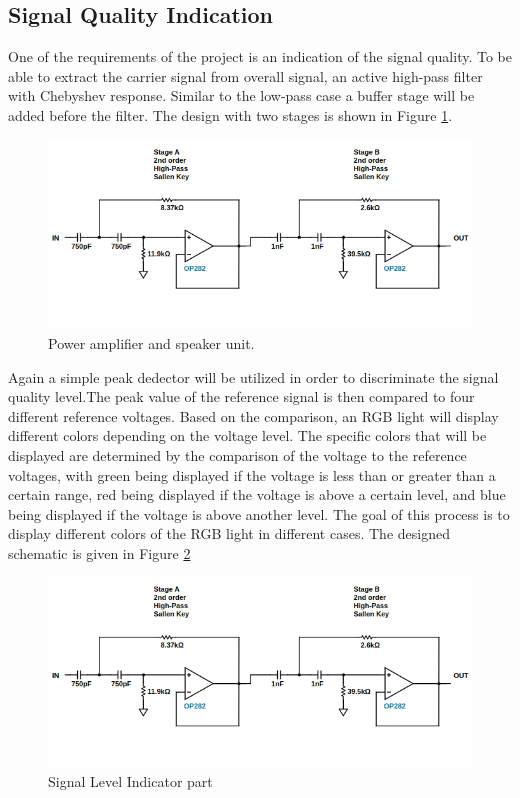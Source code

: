 \documentclass[a4paper,10pt]{IEEEtran}
\begin{document}
\subsection{Signal Quality Indication}
One of the requirements of the project is an indication of the signal quality. To be able to extract the carrier signal from overall signal, an active high-pass filter with Chebyshev response. Similar to the low-pass case a buffer stage will be added before the filter. The design with two stages is shown in Figure \ref*{active_high}.
\begin{figure}[H]
    \centering
    \includegraphics[width = 0.75\linewidth]{active_high_pass_circuit.png}
    \caption{Power amplifier and speaker unit.}
    \label{active_high}    
\end{figure} 

Again a simple peak dedector will be utilized in order to discriminate the signal quality level.The peak value of the reference signal is then compared to four different reference voltages. Based on the comparison, an RGB light will display different colors depending on the voltage level. The specific colors that will be displayed are determined by the comparison of the voltage to the reference voltages, with green being displayed if the voltage is less than or greater than a certain range, red being displayed if the voltage is above a certain level, and blue being displayed if the voltage is above another level. The goal of this process is to display different colors of the RGB light in different cases. The designed schematic is given in Figure \ref*{indicator}
\begin{figure}[H]
    \centering
    \includegraphics[width = 0.75\linewidth]{active_high_pass_circuit.png}
    \caption{Signal Level Indicator part}
    \label{indicator}    
\end{figure} 
\end{document}
